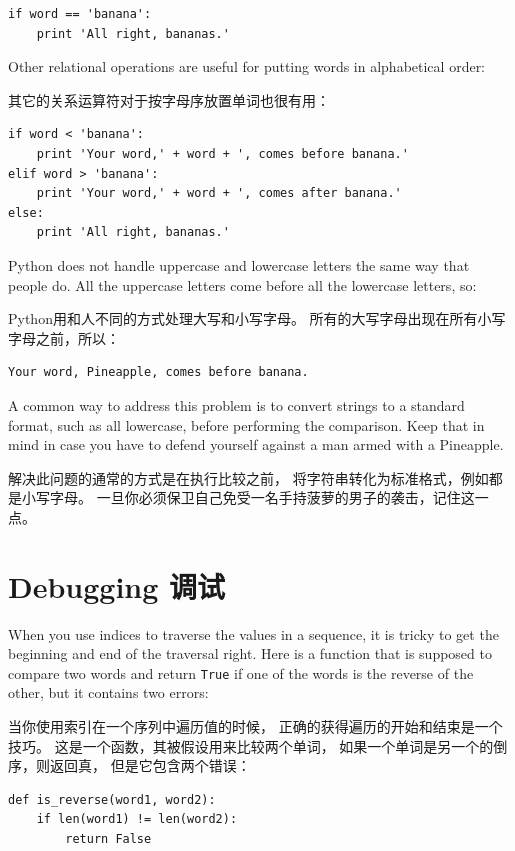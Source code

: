 \documentclass[10pt]{book}
\begin{document}
\begin{CJK}{UTF8}{gbsn}
\begin{verbatim}
if word == 'banana':
    print 'All right, bananas.'
\end{verbatim}
%
Other relational operations are useful for putting words in alphabetical
order:

其它的关系运算符对于按字母序放置单词也很有用：

\begin{verbatim}
if word < 'banana':
    print 'Your word,' + word + ', comes before banana.'
elif word > 'banana':
    print 'Your word,' + word + ', comes after banana.'
else:
    print 'All right, bananas.'
\end{verbatim}
%
Python does not handle uppercase and lowercase letters the same way
that people do.  All the uppercase letters come before all the
lowercase letters, so:

Python用和人不同的方式处理大写和小写字母。
所有的大写字母出现在所有小写字母之前，所以：

\begin{verbatim}
Your word, Pineapple, comes before banana.
\end{verbatim}
%
A common way to address this problem is to convert strings to a
standard format, such as all lowercase, before performing the
comparison.  Keep that in mind in case you have to defend yourself
against a man armed with a Pineapple.

解决此问题的通常的方式是在执行比较之前，
将字符串转化为标准格式，例如都是小写字母。
一旦你必须保卫自己免受一名手持菠萝的男子的袭击，记住这一点。

\section{Debugging 调试}

When you use indices to traverse the values in a sequence,
it is tricky to get the beginning and end of the traversal
right.  Here is a function that is supposed to compare two
words and return {\tt True} if one of the words is the reverse
of the other, but it contains two errors:

当你使用索引在一个序列中遍历值的时候，
正确的获得遍历的开始和结束是一个技巧。
这是一个函数，其被假设用来比较两个单词，
如果一个单词是另一个的倒序，则返回真，
但是它包含两个错误：

\begin{verbatim}
def is_reverse(word1, word2):
    if len(word1) != len(word2):
        return False
    

\end{verbatim}
\end{CJK}
\end{document}
